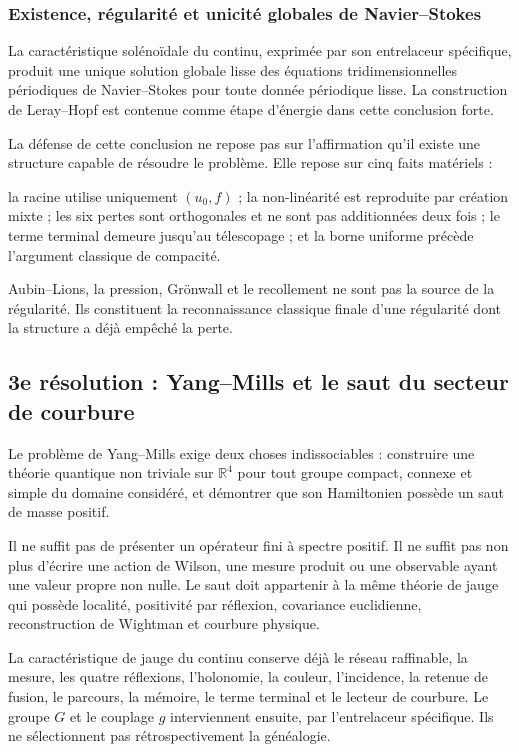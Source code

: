 \subsubsection{Existence, régularité et unicité globales de Navier--Stokes}
La caractéristique solénoïdale du continu, exprimée par son entrelaceur spécifique, produit une unique solution globale lisse des équations tridimensionnelles périodiques de Navier--Stokes pour toute donnée périodique lisse. La construction de Leray--Hopf est contenue comme étape d’énergie dans cette conclusion forte.\par
La défense de cette conclusion ne repose pas sur l’affirmation qu’il existe une structure capable de résoudre le problème. Elle repose sur cinq faits matériels :\par
la racine utilise uniquement \((u_0,f)\) ; la non-linéarité est reproduite par création mixte ; les six pertes sont orthogonales et ne sont pas additionnées deux fois ; le terme terminal demeure jusqu’au télescopage ; et la borne uniforme précède l’argument classique de compacité.\par
Aubin–Lions, la pression, Grönwall et le recollement ne sont pas la source de la régularité. Ils constituent la reconnaissance classique finale d’une régularité dont la structure a déjà empêché la perte.\par
{}
\subsection{3e résolution : Yang–Mills et le saut du secteur de courbure}
Le problème de Yang–Mills exige deux choses indissociables : construire une théorie quantique non triviale sur \(\mathbb R^4\) pour tout groupe compact, connexe et simple du domaine considéré, et démontrer que son Hamiltonien possède un saut de masse positif.\par
Il ne suffit pas de présenter un opérateur fini à spectre positif. Il ne suffit pas non plus d’écrire une action de Wilson, une mesure produit ou une observable ayant une valeur propre non nulle. Le saut doit appartenir à la même théorie de jauge qui possède localité, positivité par réflexion, covariance euclidienne, reconstruction de Wightman et courbure physique.\par
La caractéristique de jauge du continu conserve déjà le réseau raffinable, la mesure, les quatre réflexions, l’holonomie, la couleur, l’incidence, la retenue de fusion, le parcours, la mémoire, le terme terminal et le lecteur de courbure. Le groupe \(G\) et le couplage \(g\) interviennent ensuite, par l’entrelaceur spécifique. Ils ne sélectionnent pas rétrospectivement la généalogie.\par
{}
